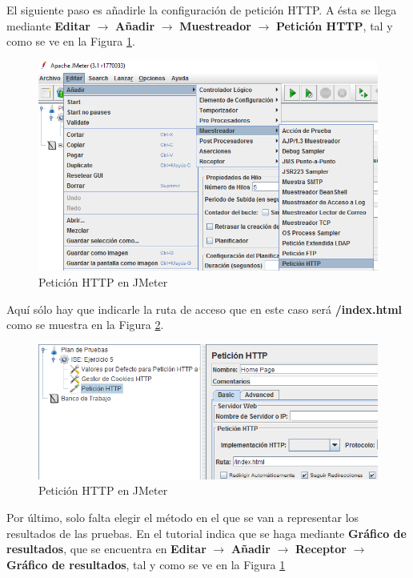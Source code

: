 El siguiente paso es añadirle la configuración de petición HTTP. A ésta se llega mediante 
\textbf{Editar} $ \rightarrow $ \textbf{Añadir} $ \rightarrow $ \textbf{Muestreador} $ \rightarrow $ \textbf{Petición HTTP}, tal y como se ve en la Figura \ref{fig:figura4-7}.

\begin{figure}[H] %
	\centering
	\includegraphics[scale=0.8]{figuras/ejercicio4/figura4-7.png} 
	\caption{Petición HTTP en JMeter} 
	\label{fig:figura4-7}
\end{figure}

Aquí sólo hay que indicarle la ruta de acceso que en este caso será \textbf{/index.html} como se muestra en la Figura \ref{fig:figura4-8}.

\begin{figure}[H] %
	\centering
	\includegraphics[scale=0.8]{figuras/ejercicio4/figura4-8.png} 
	\caption{Petición HTTP en JMeter} 
	\label{fig:figura4-8}
\end{figure}

Por último, solo falta elegir el método en el que se van a representar los resultados de las pruebas. En el tutorial indica que se haga mediante \textbf{Gráfico de resultados}, que se encuentra en \textbf{Editar} $ \rightarrow $ \textbf{Añadir} $ \rightarrow $ \textbf{Receptor} $ \rightarrow $ \textbf{Gráfico de resultados}, tal y como se ve en la Figura \ref{fig:figura4-7}

